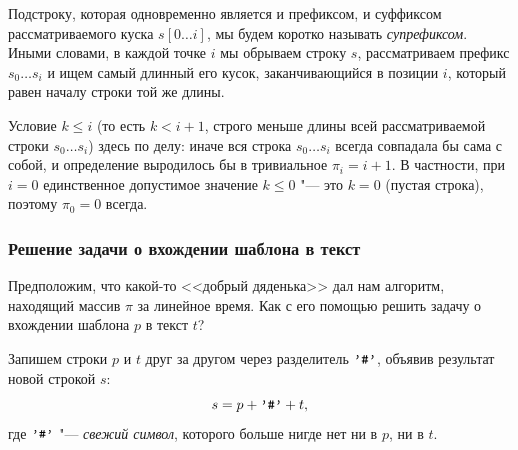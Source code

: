 Подстроку, которая одновременно является и префиксом, и суффиксом рассматриваемого куска $s[0 \dots i]$, мы будем коротко называть \textit{супрефиксом}. Иными словами, в каждой точке $i$ мы обрываем строку $s$, рассматриваем префикс $s_0 \dots s_i$ и ищем самый длинный его кусок, заканчивающийся в позиции $i$, который равен началу строки той же длины.

\begin{center}
\end{center}

Условие $k \le i$ (то есть $k < i + 1$, строго меньше длины всей рассматриваемой строки $s_0 \dots s_i$) здесь по делу: иначе вся строка $s_0 \dots s_i$ всегда совпадала бы сама с собой, и определение выродилось бы в тривиальное $\pi_i = i + 1$. В частности, при $i = 0$ единственное допустимое значение $k \le 0$ "--- это $k = 0$ (пустая строка), поэтому $\pi_0 = 0$ всегда.

\subsubsection*{Решение задачи о вхождении шаблона в текст}

Предположим, что какой-то <<добрый дяденька>> дал нам алгоритм, находящий массив $\pi$ за линейное время. Как с его помощью решить задачу о вхождении шаблона $p$ в текст $t$?

Запишем строки $p$ и $t$ друг за другом через разделитель $\text{\texttt{'\#'}}$, объявив результат новой строкой $s$:
\[
    s = p + \text{\texttt{'\#'}} + t,
\]
где $\text{\texttt{'\#'}}$ "--- \textit{свежий символ}, которого больше нигде нет ни в $p$, ни в $t$.


